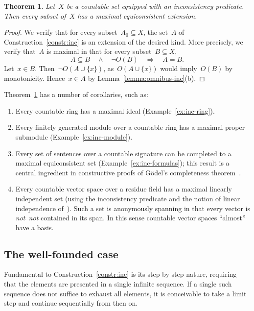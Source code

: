 \documentclass[com,11pt,crcready]{iosart2x}
\theoremstyle{definition}
\theoremstyle{plain}
\newtheorem{theorem}[definition]{Theorem}
\theoremstyle{remark}
\renewcommand{\_}{\mathpunct{.}\,}
\begin{document}
\begin{theorem}\label{thm:max-inc-countable}Let~$X$ be a countable set equipped
with an inconsistency predicate. Then every subset of~$X$ has a maximal
equiconsistent extension.\end{theorem}

\begin{proof}We verify that for every subset~$A_0 \subseteq X$, the set~$A$ of
Construction~\ref{constr:inc} is an extension of the desired kind. More
precisely, we verify that~$A$ is maximal in that for every subset~$B \subseteq X$,
\[ A \subseteq B \quad\wedge\quad \neg O(B) \quad\Longrightarrow\quad A = B. \]
Let~$x \in B$. Then~$\neg O(A \cup \{ x \})$, as~$O(A \cup \{x\})$
would imply~$O(B)$ by monotonicity. Hence~$x \in A$ by
Lemma~\ref{lemma:omnibus-inc}(b).
\end{proof}

Theorem~\ref{thm:max-inc-countable} has a number of corollaries, such as:
\begin{enumerate}
\item[(1)] Every countable ring has a maximal ideal (Example~\ref{ex:inc-ring}).
\item[(2)] Every finitely generated module
over a countable ring has a maximal proper submodule
(Example~\ref{ex:inc-module}).
\item[(3)] Every set of sentences over a countable signature can be completed to a
maximal equiconsistent set (Example~\ref{ex:inc-formulas});
this result is a central ingredient in constructive proofs of
Gödel's completeness theorem~\cite{krivine:completeness,herbelin-ilik:henkin,forster-kirst-wehr:completeness}.
\item[(4)] Every countable vector space over a residue field has a maximal linearly
independent set (using the inconsistency predicate and the notion of linear
independence of~\cite[Section~6]{wessel-schuster:radical}). Such a set is
anonymously spanning in that every vector is \emph{not~not} contained in its
span. In this sense countable vector spaces ``almost'' have a basis.
\end{enumerate}


\subsection{The well-founded case}

Fundamental to Construction~\ref{constr:inc} is its step-by-step nature,
requiring that the elements are presented in a single infinite sequence.
If a single such sequence does not
suffice to exhaust all elements, it is conceivable to take a limit step and continue
sequentially from then on.
\end{document}
